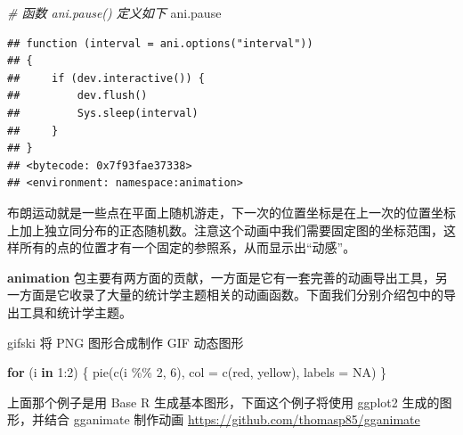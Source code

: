 \documentclass[
  b5paper,
  UTF8,twoside]{book}
\newenvironment{Shaded}{\begin{snugshade}}{\end{snugshade}}
\newcommand{\AttributeTok}[1]{\textcolor[rgb]{0.77,0.63,0.00}{#1}}
\newcommand{\CommentTok}[1]{\textcolor[rgb]{0.56,0.35,0.01}{\textit{#1}}}
\newcommand{\ConstantTok}[1]{\textcolor[rgb]{0.00,0.00,0.00}{#1}}
\newcommand{\ControlFlowTok}[1]{\textcolor[rgb]{0.13,0.29,0.53}{\textbf{#1}}}
\newcommand{\DecValTok}[1]{\textcolor[rgb]{0.00,0.00,0.81}{#1}}
\newcommand{\FunctionTok}[1]{\textcolor[rgb]{0.00,0.00,0.00}{#1}}
\newcommand{\NormalTok}[1]{#1}
\newcommand{\SpecialCharTok}[1]{\textcolor[rgb]{0.00,0.00,0.00}{#1}}
\newcommand{\StringTok}[1]{\textcolor[rgb]{0.31,0.60,0.02}{#1}}
\begin{document}
\begin{Shaded}
\begin{Highlighting}[]
\CommentTok{\# 函数 ani.pause() 定义如下}
\NormalTok{ani.pause}
\end{Highlighting}
\end{Shaded}

\begin{verbatim}
## function (interval = ani.options("interval")) 
## {
##     if (dev.interactive()) {
##         dev.flush()
##         Sys.sleep(interval)
##     }
## }
## <bytecode: 0x7f93fae37338>
## <environment: namespace:animation>
\end{verbatim}

布朗运动就是一些点在平面上随机游走，下一次的位置坐标是在上一次的位置坐标上加上独立同分布的正态随机数。注意这个动画中我们需要固定图的坐标范围，这样所有的点的位置才有一个固定的参照系，从而显示出``动感''。

\textbf{animation} 包主要有两方面的贡献，一方面是它有一套完善的动画导出工具，另一方面是它收录了大量的统计学主题相关的动画函数。下面我们分别介绍包中的导出工具和统计学主题。

gifski 将 PNG 图形合成制作 GIF 动态图形

\begin{Shaded}
\begin{Highlighting}[]
\ControlFlowTok{for}\NormalTok{ (i }\ControlFlowTok{in} \DecValTok{1}\SpecialCharTok{:}\DecValTok{2}\NormalTok{) \{}
  \FunctionTok{pie}\NormalTok{(}\FunctionTok{c}\NormalTok{(i }\SpecialCharTok{\%\%} \DecValTok{2}\NormalTok{, }\DecValTok{6}\NormalTok{), }\AttributeTok{col =} \FunctionTok{c}\NormalTok{(}\StringTok{\textquotesingle{}red\textquotesingle{}}\NormalTok{, }\StringTok{\textquotesingle{}yellow\textquotesingle{}}\NormalTok{), }\AttributeTok{labels =} \ConstantTok{NA}\NormalTok{)}
\NormalTok{\}}
\end{Highlighting}
\end{Shaded}

\begin{center}\end{center}

上面那个例子是用 Base R 生成基本图形，下面这个例子将使用 ggplot2 生成的图形，并结合 gganimate 制作动画 \url{https://github.com/thomasp85/gganimate}
\end{document}
